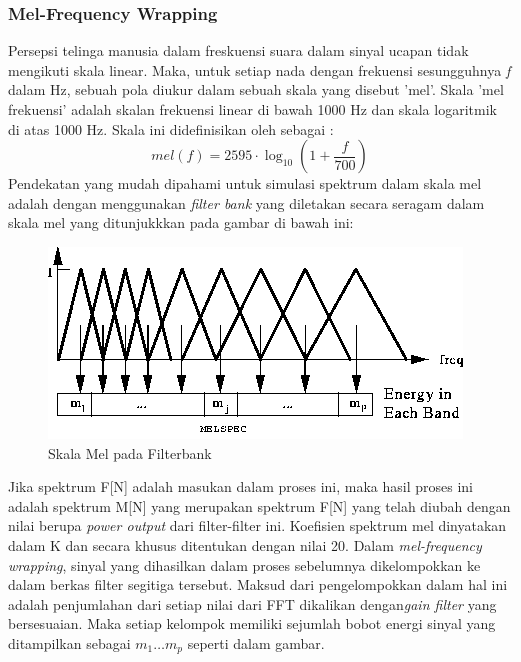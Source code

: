 \subsubsection{Mel-Frequency Wrapping}
Persepsi telinga manusia dalam freskuensi suara dalam sinyal ucapan tidak mengikuti skala linear. Maka, untuk setiap nada dengan frekuensi sesungguhnya \textit{f} dalam Hz, sebuah pola diukur dalam sebuah skala yang disebut 'mel'. Skala 'mel frekuensi' adalah skalan frekuensi linear di bawah 1000 Hz dan skala logaritmik di atas 1000 Hz.
Skala ini didefinisikan oleh %
sebagai :
\begin{equation}
mel(f) = 2595 \cdot \log_{10} \left(1 + \frac{f}{700}\right)
\end{equation}
Pendekatan yang mudah dipahami untuk simulasi spektrum dalam skala mel adalah dengan menggunakan \textit{filter bank}\label{idx:filbank} yang diletakan secara seragam dalam skala mel yang ditunjukkkan pada gambar di bawah ini:
\begin{figure}[H]
	\centering
	\includegraphics[width=0.7\linewidth]{Gambar/skala-mel}
	\caption{Skala Mel pada Filterbank}
	\label{fig:skala-mel}
\end{figure}


Jika spektrum F[N] adalah masukan dalam proses ini, maka hasil proses ini adalah spektrum M[N] yang merupakan spektrum F[N] yang telah diubah dengan nilai berupa \textit{power output} dari filter-filter ini. Koefisien spektrum mel dinyatakan dalam K dan secara khusus ditentukan dengan nilai 20.
Dalam \textit{mel-frequency wrapping}, sinyal yang dihasilkan dalam proses sebelumnya dikelompokkan ke dalam berkas filter segitiga tersebut. Maksud dari pengelompokkan dalam hal ini adalah penjumlahan dari setiap nilai dari FFT dikalikan dengan\textit{gain filter} yang bersesuaian. Maka setiap kelompok memiliki sejumlah bobot energi sinyal yang ditampilkan sebagai $ m_1 \ldots m_p $ seperti dalam gambar.
